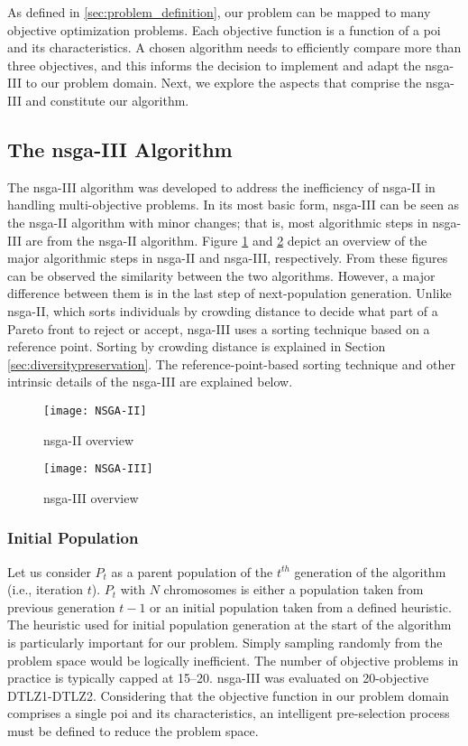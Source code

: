 As defined in \ref{sec:problem_definition}, our problem can be mapped to many objective optimization problems. Each objective function is a function of a \gls{poi} and its characteristics. A chosen algorithm needs to efficiently compare more than three objectives, and this informs the decision to implement and adapt the \gls{nsga}-III to our problem domain. Next, we explore the aspects that comprise the \gls{nsga}-III and constitute our algorithm.


\subsection*{The \Gls{nsga}-III Algorithm}
The \gls{nsga}-III algorithm was developed to address the inefficiency of \gls{nsga}-II in handling multi-objective problems. In its most basic form, \gls{nsga}-III can be seen as the \gls{nsga}-II algorithm with minor changes; that is, most algorithmic steps in \gls{nsga}-III are from the \gls{nsga}-II algorithm. Figure \ref{fig:nsgaII} and \ref{fig:nsgaIII} depict an overview of the major algorithmic steps in \gls{nsga}-II and \gls{nsga}-III, respectively. From these figures can be observed the similarity between the two algorithms. However, a major difference between them is in the last step of next-population generation. Unlike \gls{nsga}-II, which sorts individuals by crowding distance to decide what part of a Pareto front to reject or accept, \gls{nsga}-III uses a sorting technique based on a reference point. Sorting by crowding distance is explained in Section \ref{sec:diversitypreservation}. The reference-point-based sorting technique and other intrinsic details of the \gls{nsga}-III are explained below.

\begin{figure}
    \centering
    \texttt{[image: NSGA-II]}
    \caption{\gls{nsga}-II overview}
    \label{fig:nsgaII}
\end{figure}

\begin{figure}
    \centering
    \texttt{[image: NSGA-III]}
    \caption{\gls{nsga}-III overview}
    \label{fig:nsgaIII}
\end{figure}

\subsubsection{Initial Population}
Let us consider $P_t$ as a parent population of the $t^{th}$ generation of the algorithm (i.e., iteration $t$). $P_t$ with $N$ chromosomes is either a population taken from previous generation  $t-1$ or an initial population taken from a defined heuristic.\\ 
The heuristic used for initial population generation at the start of the algorithm is particularly important for our problem. Simply sampling randomly from the problem space would be logically inefficient. The number of objective problems in practice is typically capped at 15–20. \Gls{nsga}-III was evaluated on 20-objective DTLZ1-DTLZ2. Considering that the objective function in our problem domain comprises a single \gls{poi} and its characteristics, an intelligent pre-selection process must be defined to reduce the problem space.

